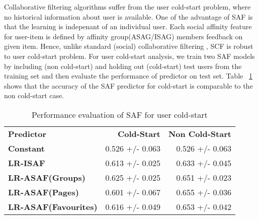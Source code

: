 Collaborative filtering algorithms suffer from the user cold-start problem,
where no historical information about user is available. One of the advantage of SAF is that 
the learning is indepenant of an individual user. Each social affinity feature for user-item is
defined by affinity group(ASAG/ISAG) members feedback on given item. 
Hence, unlike standard (social) collaborative filtering , SCF is robust to user 
cold-start problem.  For user cold-start analysis, we train two SAF models by 
including (non cold-start) and holding out (cold-start) test users from the 
training set and then evaluate the performance of predictor on test set. 
Table ~\ref{tab:coldstart} shows that the accuracy of the SAF predictor for 
cold-start is comparable to the non cold-start case.  

\begin{table}[t!]
\centering
\begin{tabular}{|>{\small}l|>{\small}r|>{\small}r|}
\hline
& \multicolumn{2}{|c|}{\textbf{Accuracy}}\\
\hline
\textbf{Predictor}& \textbf{Cold-Start} & \textbf{Non Cold-Start}\\
\hline
\textbf{Constant} & 0.526  +/-  0.063 & 0.526  +/-  0.063 \\
\hline
\textbf{LR-ISAF} & 0.613 +/- 0.025 & 0.633  +/-  0.045 \\
\hline
\textbf{LR-ASAF(Groups)} & 0.625  +/-  0.025 & 0.651  +/-  0.023 \\
\hline
\textbf{LR-ASAF(Pages)} & 0.601  +/-  0.067 & 0.655  +/-  0.036 \\
\hline
\textbf{LR-ASAF(Favourites)} & 0.616  +/-  0.049 & 0.653  +/-  0.042\\
\hline
\end{tabular}
\caption{Performance evaluation of SAF for user cold-start}
\label{tab:coldstart}
\end{table}